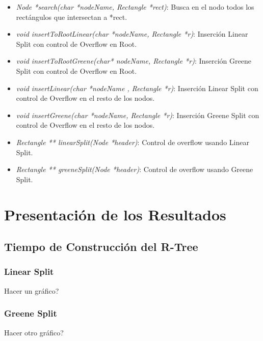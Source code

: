 \documentclass[letterpaper,10pt]{article}
\begin{document}
\begin{itemize}
		\item \textit{Node *search(char *nodeName, Rectangle *rect)}: Busca en el nodo todos los rectángulos que intersectan a *rect.
		\item \textit{void insertToRootLinear(char *nodeName, Rectangle *r)}: Inserción Linear Split con control de Overflow en Root.
		\item \textit{void insertToRootGreene(char* nodeName, Rectangle *r)}: Inserción Greene Split con control de Overflow en Root.
		\item \textit{void insertLinear(char *nodeName , Rectangle *r)}: Inserción Linear Split con control de Overflow en el resto de los nodos.
		\item \textit{void insertGreene(char *nodeName, Rectangle *r)}: Inserción Greene Split con control de Overflow en el resto de los nodos.
		\item \textit{Rectangle ** linearSplit(Node *header)}: Control de overflow usando Linear Split.
		\item \textit{Rectangle ** greeneSplit(Node *header)}: Control de overflow usando Greene Split.
	\end{itemize}

	\newpage

	\section{Presentación de los Resultados}

	\subsection{Tiempo de Construcción del R-Tree}
	\subsubsection{Linear Split}
	Hacer un gráfico?

	\subsubsection{Greene Split}
	Hacer otro gráfico?
\end{document}
